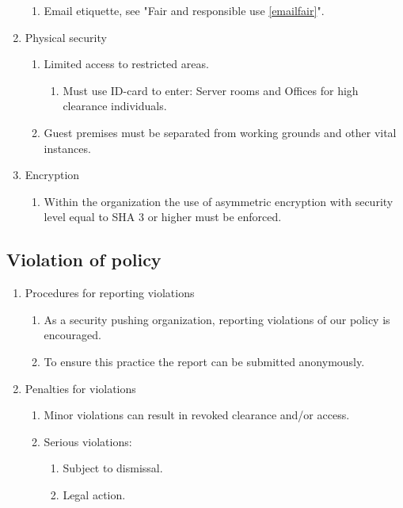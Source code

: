 \begin{enumerate}
\begin{enumerate}
    \item Email etiquette, see "Fair and responsible use \ref{emailfair}".
  \end{enumerate}
  \item Physical security
  \begin{enumerate}
    \item Limited access to restricted areas.
    \begin{enumerate}
      \item Must use ID-card to enter: Server rooms and Offices for high clearance individuals.
    \end{enumerate}
    \item Guest premises must be separated from working grounds and other vital instances.
  \end{enumerate}
  \item Encryption
  \begin{enumerate}
    \item Within the organization the use of asymmetric encryption with security level equal to SHA 3 or higher must be enforced.
  \end{enumerate}
\end{enumerate}

\subsection{Violation of policy}

\begin{enumerate}
  \item Procedures for reporting violations
  \begin{enumerate}
    \item As a security pushing organization, reporting violations of our policy is encouraged.
    \item To ensure this practice the report can be submitted anonymously.
  \end{enumerate}
    \item Penalties for violations
  \begin{enumerate}
    \item Minor violations can result in revoked clearance and/or access.
    \item Serious violations:
    \begin{enumerate}
      \item Subject to dismissal.
      \item Legal action.
    \end{enumerate}
  \end{enumerate}
\end{enumerate}

